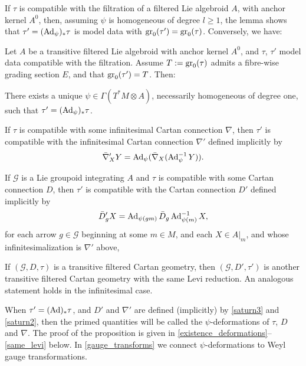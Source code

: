 \documentclass[leqno,12pt]{amsart} %
\begin{document}
If $\tau $ is compatible with the filtration of a filtered Lie algebroid $A$, with anchor
kernel $A^0$, then, assuming $\psi $ is homogeneous of degree $l \ge 1$, the lemma shows
that $\tau' = (\operatorname{Ad}_\psi)_* \tau $ is model data with
$\operatorname{\operatorname{gr}}_0(\tau') = \operatorname{\operatorname{gr}}_0(\tau)$. Conversely, we have:
\begin{proposition}
  Let $A$ be a transitive filtered Lie algebroid with anchor kernel $A^0$, and $\tau$,
  $\tau'$ model data compatible with the filtration. Assume $T := \operatorname{\operatorname{gr}}_0(\tau)$ admits
  a fibre-wise grading section $E$, and that $\operatorname{\operatorname{gr}}_0(\tau') = T$. Then:
  \begin{conditions}
  \item\label{saturn1} There exists a unique $\psi \in \Gamma(T^*\!M \otimes A)$,
    necessarily homogeneous of degree one, such that $\tau' = (\operatorname{Ad}_\psi)_*\tau$.
  \item\label{saturn2} If $\tau $ is compatible with some infinitesimal Cartan connection
    $\nabla $, then $\tau'$ is compatible with the infinitesimal Cartan connection
    $\nabla'$ defined implicitly by
    $$\bar\nabla'_XY = \operatorname{Ad}_\psi (\bar\nabla_X(\operatorname{Ad}_\psi^{-1}Y)).$$
  \item \label{saturn3} If ${\mathcal G} $ is a Lie groupoid integrating $A$ and $\tau $
    is compatible with some Cartan connection $D$, then $\tau'$ is compatible with the
    Cartan connection $D'$ defined implicitly by
    $$\bar D'_gX = \operatorname{Ad}_{\psi(gm)}\bar D_g \operatorname{Ad}_{\psi(m)}^{-1}X,$$ for each arrow
    $g \in {\mathcal G} $ beginning at some $m \in M$, and each $X \in A|_{m}$, and whose
    infinitesimalization is $\nabla'$ above,
  \item\label{saturn5} If $({\mathcal G}, D, \tau)$ is a transitive filtered Cartan
    geometry, then $({\mathcal G}, D', \tau')$ is another transitive filtered Cartan
    geometry with the same Levi reduction. An analogous statement holds in the
    infinitesimal case.
  \end{conditions}

\end{proposition}
%

When $\tau'=(\operatorname{Ad})_*\tau$, and $D'$ and $\nabla'$ are defined (implicitly) by
\eqref{saturn3} and \eqref{saturn2}, then the primed quantities will be called the {\df
  $\psi$-deformations} of $\tau $, $D$ and $\nabla $. The proof of the proposition is
given in \ref{existence_deformations}--\ref{same_levi} below. In \ref{gauge_transforms} we
connect $\psi$-deformations to Weyl gauge transformations.
\end{document}
